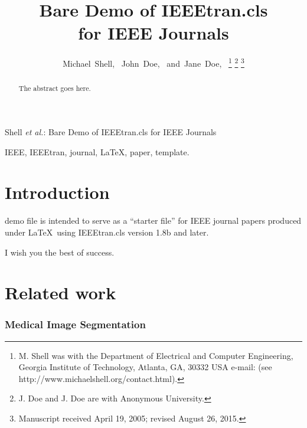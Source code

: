 \documentclass[journal]{IEEEtran}
\begin{document}
\title{Bare Demo of IEEEtran.cls\\ for IEEE Journals}

\author{Michael~Shell,~
        John~Doe,~
        and~Jane~Doe,~%
\thanks{M. Shell was with the Department
of Electrical and Computer Engineering, Georgia Institute of Technology, Atlanta,
GA, 30332 USA e-mail: (see http://www.michaelshell.org/contact.html).}%
\thanks{J. Doe and J. Doe are with Anonymous University.}%
\thanks{Manuscript received April 19, 2005; revised August 26, 2015.}}


%
{Shell \MakeLowercase{\textit{et al.}}: Bare Demo of IEEEtran.cls for IEEE Journals}

\maketitle

\begin{abstract}
The abstract goes here.
\end{abstract}

\begin{IEEEkeywords}
IEEE, IEEEtran, journal, \LaTeX, paper, template.
\end{IEEEkeywords}


\section{Introduction}
 demo file is intended to serve as a ``starter file''
for IEEE journal papers produced under \LaTeX\ using
IEEEtran.cls version 1.8b and later.
 
I wish you the best of success.

\section{Related work}\label{section_related_work}

\subsubsection{Medical Image Segmentation}
\end{document}
